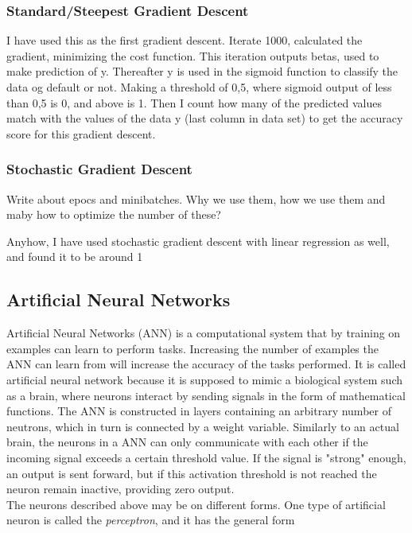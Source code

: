 \documentclass[a4paper,11pt,twocolumn]{article}
\begin{document}
\subsubsection{Standard/Steepest Gradient Descent}
I have used this as the first gradient descent. Iterate 1000, calculated the gradient, minimizing the cost function. This iteration outputs betas, used to make prediction of y. Thereafter y is used in the sigmoid function to classify the data og default or not. Making a threshold of 0,5, where sigmoid output of less than 0,5 is 0, and above is 1. Then I count how many of the predicted values match with the values of the data y (last column in data set) to get the accuracy score for this gradient descent.  

\subsubsection{Stochastic Gradient Descent}

Write about epocs and minibatches. Why we use them, how we use them and maby how to optimize the number of these? 

Anyhow, I have used stochastic gradient descent with linear regression as well, and found it to be around 1%

\subsection{Artificial Neural Networks}

Artificial Neural Networks (ANN) is a computational system that by training on examples can learn to perform tasks. Increasing the number of examples the ANN can learn from will increase the accuracy of the tasks performed. It is called artificial neural network because it is supposed to mimic a biological system such as a brain, where neurons interact by sending signals in the form of mathematical functions. The ANN is constructed in layers containing an arbitrary number of neutrons, which in turn is connected by a weight variable. Similarly to an actual brain, the neurons in a ANN can only communicate with each other if the incoming signal exceeds a certain threshold value. If the signal is "strong" enough, an output is sent forward, but if this activation threshold is not reached the neuron remain inactive, providing zero output\cite{slides}. 
\\

The neurons described above may be on different forms. One type of artificial neuron is called the \textit{perceptron}, and it has the general form 
\end{document}
